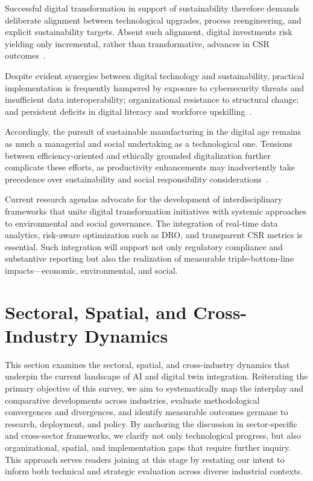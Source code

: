 \documentclass[sigconf]{acmart}
\begin{document}
Successful digital transformation in support of sustainability therefore demands deliberate alignment between technological upgrades, process reengineering, and explicit sustainability targets. Absent such alignment, digital investments risk yielding only incremental, rather than transformative, advances in CSR outcomes~\cite{ref43}.

Despite evident synergies between digital technology and sustainability, practical implementation is frequently hampered by exposure to cybersecurity threats and insufficient data interoperability; organizational resistance to structural change; and persistent deficits in digital literacy and workforce upskilling~\cite{ref18}\cite{ref29}\cite{ref40}.

Accordingly, the pursuit of sustainable manufacturing in the digital age remains as much a managerial and social undertaking as a technological one. Tensions between efficiency-oriented and ethically grounded digitalization further complicate these efforts, as productivity enhancements may inadvertently take precedence over sustainability and social responsibility considerations~\cite{ref85}.

Current research agendas advocate for the development of interdisciplinary frameworks that unite digital transformation initiatives with systemic approaches to environmental and social governance. The integration of real-time data analytics, risk-aware optimization such as DRO, and transparent CSR metrics is essential. Such integration will support not only regulatory compliance and substantive reporting but also the realization of measurable triple-bottom-line impacts—economic, environmental, and social.

\section{Sectoral, Spatial, and Cross-Industry Dynamics}

This section examines the sectoral, spatial, and cross-industry dynamics that underpin the current landscape of AI and digital twin integration. Reiterating the primary objective of this survey, we aim to systematically map the interplay and comparative developments across industries, evaluate methodological convergences and divergences, and identify measurable outcomes germane to research, deployment, and policy. By anchoring the discussion in sector-specific and cross-sector frameworks, we clarify not only technological progress, but also organizational, spatial, and implementation gaps that require further inquiry. This approach serves readers joining at this stage by restating our intent to inform both technical and strategic evaluation across diverse industrial contexts.
\end{document}
